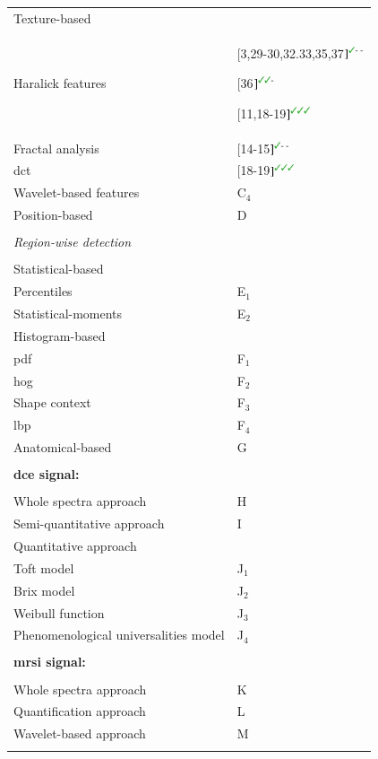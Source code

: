 \begin{table}
\begin{tabular}{p{.5\linewidth} p{.4\linewidth}}
		\quad \quad Texture-based & \\
		\quad \quad \quad Haralick features & $[$3,29-30,32.33,35,37$]^{\text{{\cmarksmall}- -}}$\par $[$36$]^{\text{{\cmarksmall}{\cmarksmall}-}}$\par $[$11,18-19$]^{\text{{\cmarksmall}{\cmarksmall}{\cmarksmall}}}$ \\
		\quad \quad \quad Fractal analysis & $[$14-15$]^{\text{{\cmarksmall}- -}}$ \\
		\quad \quad \quad \Ac{dct} & $[$18-19$]^{\text{{\cmarksmall}{\cmarksmall}{\cmarksmall}}}$ \\
		\quad \quad \quad Wavelet-based features & C$_4$ \\
		\quad \quad Position-based & D \\ \\ [-1.5ex]
		\quad \textit{Region-wise detection} &  \\ \\ [-1.5ex]
		\quad \quad Statistical-based & \\
		\quad \quad \quad Percentiles & E$_1$ \\
		\quad \quad \quad Statistical-moments & E$_2$ \\
		\quad \quad Histogram-based & \\
		\quad \quad \quad \Ac{pdf} & F$_1$ \\
		\quad \quad \quad \Ac{hog} & F$_2$ \\
		\quad \quad \quad Shape context & F$_3$ \\
		\quad \quad \quad \Ac{lbp} & F$_4$ \\
		\quad \quad Anatomical-based & G \\ \\ [-1.5ex]
		\textbf{\ac{dce} signal:} & \\ \\ [-1.5ex]
		\quad Whole spectra approach & H \\
		\quad Semi-quantitative approach & I \\
		\quad Quantitative approach &  \\
		\quad \quad Toft model & J$_1$ \\
		\quad \quad Brix model & J$_2$ \\
		\quad \quad Weibull function & J$_3$ \\
		\quad \quad Phenomenological universalities model & J$_4$ \\
		\\ [-1.5ex]
		\textbf{\ac{mrsi} signal:} & \\ \\ [-1.5ex]
		\quad Whole spectra approach & K \\
		\quad Quantification approach & L \\
		\quad Wavelet-based approach & M \\ \\ [-1.5ex]
		\hline
	\end{tabular}
	\label{tab:feat}
\end{table}

